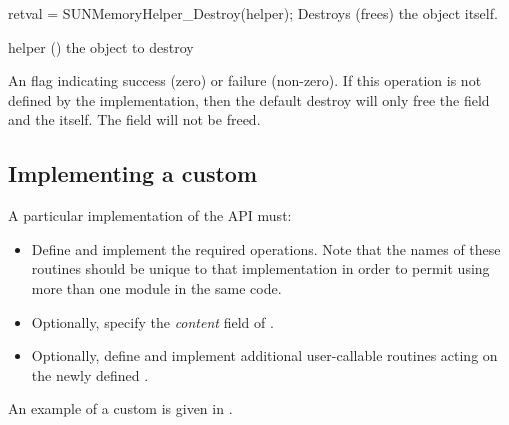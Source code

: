 {
  retval = SUNMemoryHelper\_Destroy(helper);
}
{
  Destroys (frees) the  object itself.
}
{
  \begin{args}[helper]
  \item[helper] () the  object to destroy
  \end{args}
}
{
  An  flag indicating success (zero) or failure (non-zero).
}
{
  \warn If this operation is not defined by the implementation, then the default
  destroy will only free the  field and the  itself.
  The  field will not be freed.
}


%
%
\subsection{Implementing a custom }\label{ss:sunmemory_custom}

A particular implementation of the  API must:
\begin{itemize}
\item Define and implement the required operations.
  Note that the names of these routines should be unique to that implementation
  in order to permit using more than one  module in the
  same code.
\item Optionally, specify the {\em content} field of .
\item Optionally, define and implement additional user-callable routines
  acting on the newly defined .
\end{itemize}
An example of a custom  is given in
.
